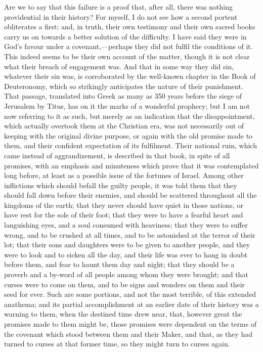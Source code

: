 Are we to say that this failure is a proof that, after all, there
was nothing providential in their history? For myself, I do not see
how a second portent obliterates a first; and, in truth, their own
testimony and their own sacred books carry us on towards a better
solution of the difficulty. I have said they were in God's favour
under a covenant,—perhaps they did not fulfil the conditions of it.
This indeed seems to be their own account of the matter, though it is
not clear what their breach of engagement was. And that in some way
they did sin, whatever their sin was, is corroborated by the
well-known chapter in the Book of Deuteronomy, which so strikingly
anticipates the nature of their punishment. That passage, translated
into Greek as many as 350 years before the siege of Jerusalem by
Titus, has on it the marks of a wonderful prophecy; but I am not now
referring to it as such, but merely as an indication that the
disappointment, which actually overtook them at the Christian era, was
not necessarily out of keeping with the original divine purpose, or
again with the old promise made to them, and their confident
expectation of its fulfilment. Their national ruin, which came instead
of aggrandizement, is described in that book, in spite of all
promises, with an emphasis and minuteness which prove that it was
contemplated long before, at least as a possible issue of the fortunes
of Israel. Among other inflictions which should befall the guilty
people, it was told them that they should fall down before their
enemies, and should be scattered throughout all the kingdoms of the
earth; that they never should have quiet in those nations, or have
rest for the sole of their foot; that they were to have a fearful
heart and languishing eyes, and a soul consumed with heaviness; that
they were to suffer wrong, and to be crushed at all times, and to be
astonished at the terror of their lot; that their sons and daughters
were to be given to another people, and they were to look and to
sicken all the day, and their life was ever to hang in doubt before
them, and fear to haunt them day and night; that they should be a
proverb and a by-word of all people among whom they were brought; and
that curses were to come on them, and to be signs and wonders on them
and their seed for ever. Such are some portions, and not the most
terrible, of this extended anathema; and its partial accomplishment at
an earlier date of their history was a warning to them, when the
destined time drew near, that, however great the promises made to them
might be, those promises were dependent on the terms of the covenant
which stood between them and their Maker, and that, as they had turned
to curses at that former time, so they might turn to curses again.

